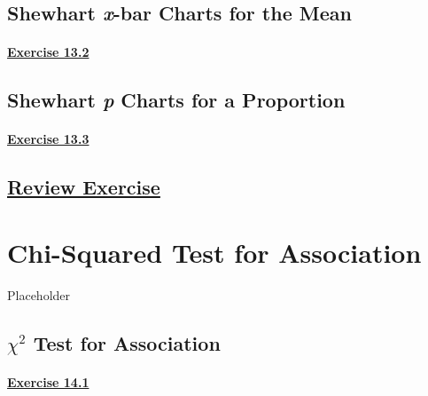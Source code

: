 \documentclass[
  11pt,
]{book}
\begin{document}
\section{\texorpdfstring{Shewhart \textit{x}-bar Charts for the Mean}{Shewhart -bar Charts for the Mean}}\label{shewhart--bar-charts-for-the-mean}

\subsubsection*{\texorpdfstring{\hyperref[ex132a]{Exercise 13.2}}{Exercise 13.2}}\label{exercise-13.2}

\section{\texorpdfstring{Shewhart \textit{p} Charts for a Proportion}{Shewhart  Charts for a Proportion}}\label{shewhart-charts-for-a-proportion}

\subsubsection*{\texorpdfstring{\hyperref[ex133a]{Exercise 13.3}}{Exercise 13.3}}\label{exercise-13.3}

\section*{\texorpdfstring{\hyperref[re18a]{Review Exercise}}{Review Exercise}}\label{review-exercise-12}

\chapter{Chi-Squared Test for Association}\label{chi-squared-test-for-association}

Placeholder

\section{\texorpdfstring{\(\chi^\text{2}\) Test for Association}{\textbackslash chi\^{}\textbackslash text\{2\} Test for Association}}\label{chitext2-test-for-association}

\subsubsection*{\texorpdfstring{\hyperref[ex141a]{Exercise 14.1}}{Exercise 14.1}}\label{exercise-14.1}
\end{document}

